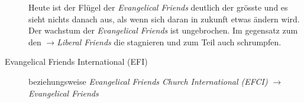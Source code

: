 \begin{description}
  Heute ist der Flügel der \textit{Evangelical Friends} deutlich der grösste und
  es sieht nichts danach aus, als wenn sich daran in zukunft etwas ändern wird.
  Der wachstum der \textit{Evangelical Friends} ist ungebrochen. Im gegensatz
  zum den $\to$\textit{Liberal Friends} die stagnieren und zum Teil auch
  schrumpfen.


 \item[Evangelical Friends International (EFI)] beziehungsweise
 \textit{Evangelical Friends Church International (EFCI)}
 $\to$\textit{Evangelical Friends}


 \end{description}

\normalsize

